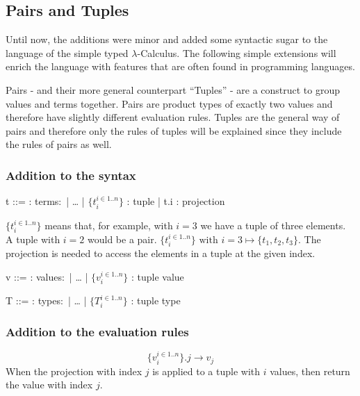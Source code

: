 \subsection{Pairs and Tuples}

Until now, the additions were minor and added some syntactic sugar to the language of
the simple typed $\lambda$-Calculus. The following simple extensions will enrich
the language with features that are often found in programming languages.

Pairs - and their more general counterpart ``Tuples'' - are a construct to group
values and terms together. Pairs are product types of exactly two values
and therefore have slightly different evaluation rules. Tuples are the general way
of pairs and therefore only the rules of tuples will be explained since they include
the rules of pairs as well.

\subsubsection{Addition to the syntax \cite{pierce2002ProgLang}}
\begin{bnfgrammar}
    t ::= : terms$\colon$
    | \dots
    | $\{t_i^{i \in 1..n}\}$ : tuple
    | t.i : projection
\end{bnfgrammar}\leavevmode\newline
$\{t_i^{i \in 1..n}\}$ means that, for example, with $i=3$ we have a tuple
of three elements. A tuple with $i=2$ would be a pair.
$\{t_i^{i \in 1..n}\} \text{ with } i=3 \mapsto \{t_1, t_2, t_3\}$.
The projection is needed to access the elements in a tuple at the given index.

\begin{bnfgrammar}
    v ::= : values$\colon$
    | \dots
    | $\{v_i^{i \in 1..n}\}$ : tuple value
\end{bnfgrammar}\leavevmode\newline

\begin{bnfgrammar}
    T ::= : types$\colon$
    | \dots
    | $\{T_i^{i \in 1..n}\}$ : tuple type
\end{bnfgrammar}\leavevmode\newline

\subsubsection{Addition to the evaluation rules \cite{pierce2002ProgLang}}
\begin{equation*}
    \tag{Tuple projection}
    \{v_i^{i \in 1..n}\} . j \rightarrow v_j
\end{equation*}
When the projection with index $j$ is applied to a tuple with
$i$ values, then return the value with index $j$.

